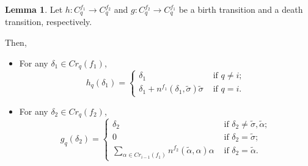 \documentclass[a4paper,12pt,notitlepage]{amsart}
\theoremstyle{definition}%
\newtheorem{lemma}[theorem]{Lemma}
\theoremstyle{definition}%
\theoremstyle{definition}%
\begin{document}
\begin{lemma}
Let 
$h:C_q^{f_1} \to C_q^{f_2}$ and $g:C_q^{f_2} \to C_q^{f_1}$ be a birth transition and 
a death transition, 
respectively.

Then, 
\begin{itemize}


\item For any  $\delta_1\in Cr_q(f_1)$, 
$$h_q(\delta_1)= 
\begin{cases}
\delta_1 & \text{ if }q\neq i; \\
\delta_1+n^{f_1}(\delta_1, \tilde{\sigma}) \tilde{\sigma} &\text{ if } q=i.  


\end{cases}$$

\item For any  $\delta_2\in Cr_q(f_2)$, 
$$g_q(\delta_2)= 
\begin{cases}
\delta_2 & \text{ if }\delta_2 \neq \tilde{\sigma}, \tilde{\alpha};  	\\
0 &\text{ if } \delta_2=\tilde{\sigma};		\\
\displaystyle  \sum_{\alpha\in Cr_{i-1}(f_1)} n^{f_2} (\tilde{\alpha}, \alpha) \alpha & \text{ if }  \delta_2=\tilde{\alpha}.  


\end{cases}$$


\end{itemize}




\end{lemma}
\end{document}
